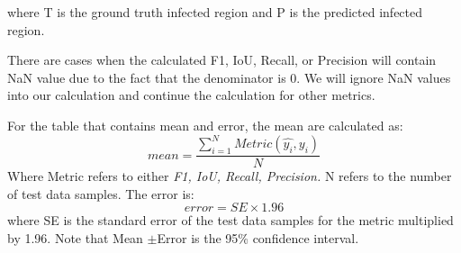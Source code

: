 where T is the ground truth infected region and P is the predicted infected region.

There are cases when the calculated F1, IoU, Recall, or Precision will contain NaN value due to the fact that the denominator is 0. We will ignore NaN values into our calculation and continue the calculation for other metrics.

For the table that contains mean and error, the mean are calculated as:
\begin{equation}
mean =  \frac{\sum_{i=1}^{N}Metric(\hat{y_i}, y_i)}{N}
\end{equation}
Where Metric refers to either \textit{F1, IoU, Recall, Precision.} N refers to the number of test data samples.
The error is:
\begin{equation}
error =  SE \times 1.96
\end{equation}
where SE is the standard error of the test data samples for the metric multiplied by 1.96.
Note that Mean $\pm$Error is the 95\% confidence interval.